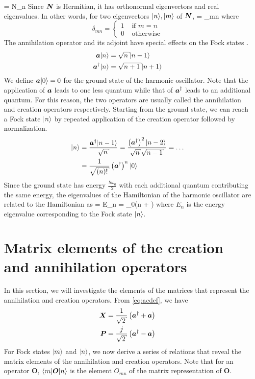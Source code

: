 \beq
\opN{} = N_n
\eeq
Since $\boldsymbol N$ is Hermitian, it has orthonormal eigenvectors and real eigenvalues. In other words, for two eigenvectors $|n\rangle,|m\rangle$ of $\boldsymbol N$, 
\beq
{} = \delta_{mn}
\eeq
where $$
\delta_{mn} = \left\{ \begin{array}{rl}
1 &\mbox{ if $m = n$} \\
0 &\mbox{ otherwise}
\end{array} \right.
$$
The annihilation operator and its adjoint have special effects on the Fock states \cite{griffiths}.
\begin{align}
\opa\ket{n} &= \sqrt{n}\ket{n-1}\\
\opaa\ket{n} &= \sqrt{n+1}\ket{n+1}
\end{align}
We define $\boldsymbol a|0\rangle = 0$ for the ground state of the harmonic oscillator. Note that the application of $\boldsymbol a$ leads to one less quantum while that of $\boldsymbol a^{\dagger}$ leads to an additional quantum. For this reason, the two operators are usually called the annihilation and creation operators respectively. Starting from the ground state, we can reach a Fock state $|n\rangle$ by repeated application of the creation operator followed by normalization.
\begin{align}
\ket{n} &= \frac{\opaa\ket{n-1}}{\sqrt{n}} = \frac{\left(\opaa\right)^2\ket{n-2}}{\sqrt{n}\sqrt{n-1}}=\ldots\\
&= \frac{1}{\sqrt{\left(n\right)!}}\left(\opaa\right)^n\ket{0}
\end{align}
Since the ground state has energy $\frac{\hbar\omega_0}{2}$ with each additional quantum contributing the same energy, the eigenvalues of the Hamiltonian of the harmonic oscillator are related to the Hamiltonian as 
\beq
\opH{} = E_n = \hbar\omega_0\left(n + \right)
\eeq
where $E_n$ is the energy eigenvalue corresponding to the Fock state $|n\rangle$.
\section{Matrix elements of the creation and annihilation operators}
In this section, we will investigate the elements of the matrices that represent the annihilation and creation operators. From \eqref{eq:acdef}, we have
\begin{align}
\label{eq:xaaa}
\opX &= \frac{1}{\sqrt{2}}\left(\opaa + \opa\right)\\
\label{eq:paaa}
\opP &= \frac{j}{\sqrt{2}}\left(\opaa - \opa\right)
\end{align}
For Fock states $|m\rangle$ and $|n\rangle$, we now derive a series of relations that reveal the matrix elements of the annihilation and creation operators. Note that for an operator $\boldsymbol O$, $\langle m|\boldsymbol O|n\rangle$ is the element $O_{mn}$ of the matrix representation of $\boldsymbol O$.

